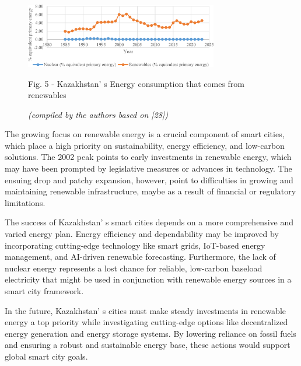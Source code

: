 \begin{figure}[H]
	\centering
	\includegraphics[width=0.75\textwidth]{media/ekon/Graph_16}
	\caption*{Fig. 5 - Kazakhstan' s Energy consumption that comes from renewables}
	\caption*{\normalfont \emph{(compiled by the authors based on {[}28{]})}}
\end{figure}

\begin{multicols}{2}
The growing focus on renewable energy is a crucial component of smart
cities, which place a high priority on sustainability, energy
efficiency, and low-carbon solutions. The 2002 peak points to early
investments in renewable energy, which may have been prompted by
legislative measures or advances in technology. The ensuing drop and
patchy expansion, however, point to difficulties in growing and
maintaining renewable infrastructure, maybe as a result of financial or
regulatory limitations.

The success of Kazakhstan' s smart cities depends on a
more comprehensive and varied energy plan. Energy efficiency and
dependability may be improved by incorporating cutting-edge technology
like smart grids, IoT-based energy management, and AI-driven renewable
forecasting. Furthermore, the lack of nuclear energy represents a lost
chance for reliable, low-carbon baseload electricity that might be used
in conjunction with renewable energy sources in a smart city framework.

In the future, Kazakhstan' s cities must make steady
investments in renewable energy a top priority while investigating
cutting-edge options like decentralized energy generation and energy
storage systems. By lowering reliance on fossil fuels and ensuring a
robust and sustainable energy base, these actions would support global
smart city goals.
\end{multicols}

